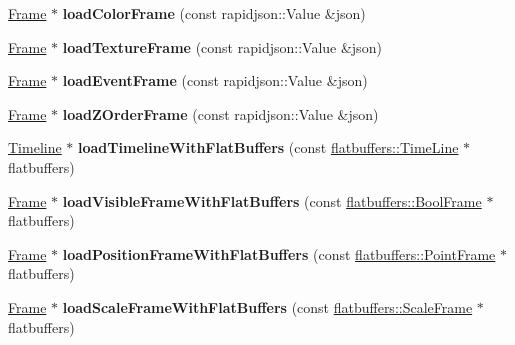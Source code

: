 \begin{DoxyCompactItemize}
\hyperlink{classFrame}{Frame} $\ast$ {\bfseries load\+Color\+Frame} (const rapidjson\+::\+Value \&json)
\item 
\mbox{\label{classActionTimelineCache_a44f95e852b84c9965cba5b935b4a5eca}} 
\hyperlink{classFrame}{Frame} $\ast$ {\bfseries load\+Texture\+Frame} (const rapidjson\+::\+Value \&json)
\item 
\mbox{\label{classActionTimelineCache_ab860055eded32995dbe4a66d9cec16ba}} 
\hyperlink{classFrame}{Frame} $\ast$ {\bfseries load\+Event\+Frame} (const rapidjson\+::\+Value \&json)
\item 
\mbox{\label{classActionTimelineCache_ae2fff949b0fa6588be5f4111701414a0}} 
\hyperlink{classFrame}{Frame} $\ast$ {\bfseries load\+Z\+Order\+Frame} (const rapidjson\+::\+Value \&json)
\item 
\mbox{\label{classActionTimelineCache_a372bfbc5014fd00d5e4e6b1fb521aab4}} 
\hyperlink{classTimeline}{Timeline} $\ast$ {\bfseries load\+Timeline\+With\+Flat\+Buffers} (const \hyperlink{structflatbuffers_1_1TimeLine}{flatbuffers\+::\+Time\+Line} $\ast$flatbuffers)
\item 
\mbox{\label{classActionTimelineCache_a9e2fb6e63dada7756ec5b15e9db78fe5}} 
\hyperlink{classFrame}{Frame} $\ast$ {\bfseries load\+Visible\+Frame\+With\+Flat\+Buffers} (const \hyperlink{structflatbuffers_1_1BoolFrame}{flatbuffers\+::\+Bool\+Frame} $\ast$flatbuffers)
\item 
\mbox{\label{classActionTimelineCache_a32047721ac943d13516a4ab66ba5ef01}} 
\hyperlink{classFrame}{Frame} $\ast$ {\bfseries load\+Position\+Frame\+With\+Flat\+Buffers} (const \hyperlink{structflatbuffers_1_1PointFrame}{flatbuffers\+::\+Point\+Frame} $\ast$flatbuffers)
\item 
\mbox{\label{classActionTimelineCache_a3bfe1ad3a704bdefecb9d01a00442f49}} 
\hyperlink{classFrame}{Frame} $\ast$ {\bfseries load\+Scale\+Frame\+With\+Flat\+Buffers} (const \hyperlink{structflatbuffers_1_1ScaleFrame}{flatbuffers\+::\+Scale\+Frame} $\ast$flatbuffers)
\item 
\mbox{\label{classActionTimelineCache_ad755e45726bfecaa24a8954adc5e195c}} 

\end{DoxyCompactItemize}
